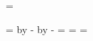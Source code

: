 

\newdimen\pagewidth \pagewidth=30pc
\newdimen\pageheight \pageheight=48pc
\newdimen\margintop \margintop=4.5pc
\newdimen\marginbot \marginbot=\margintop
\newdimen\margininner \margininner=5pc
\newdimen\marginouter \marginouter=3pc

\hsize=\pagewidth
\advance\hsize by -\margininner
\advance\hsize by -\marginouter
\voffset=\margintop
\hoffset=\margininner
\vsize=\pagewidth
